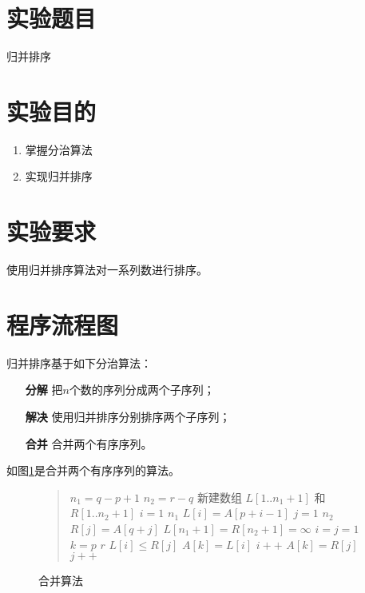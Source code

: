 \documentclass[cs4size,a4paper,nofonts]{ctexart}
\begin{document}
\newpage

\section{实验题目}
归并排序
\section{实验目的}
\begin{enumerate}[topsep=0pt,partopsep=0pt,itemsep=0pt,parsep=0pt]
\item 掌握分治算法
\item 实现归并排序
\end{enumerate}
\section{实验要求}
使用归并排序算法对一系列数进行排序。

\begin{quote}

\end{quote}

\section{程序流程图}

归并排序基于如下分治算法：
\begin{enumerate}[topsep=0pt,partopsep=0pt,itemsep=0pt,parsep=0pt]
\item[\bf 分解] 把$n$个数的序列分成两个子序列；
\item[\bf 解决] 使用归并排序分别排序两个子序列；
\item[\bf 合并] 合并两个有序序列。
\end{enumerate}

如图\ref{Merge}是合并两个有序序列的算法。

\begin{figure}[htp]
\begin{quote}
\begin{codebox}
\li $n_1 = q - p + 1$
\li $n_2 = r - q$
\li 新建数组 $L[1..n_1+1]$ 和 $R[1..n_2+1]$
\li \For $i = 1$ \To $n_1$ \Do
\li   $L[i] = A[p + i -1]$
     \End
\li \For $j = 1$ \To $n_2$ \Do
\li   $R[j] = A[q + j]$
     \End
\li $L[n_1 + 1] = R[n_2 + 1] = \infty$
\li $i = j = 1$
\li \For $k = p$ \To $r$ \Do
\li   \If $L[i] \le R[j]$ \Then
\li     $A[k] = L[i]$
\li     $i++$
\li   \Else
\li     $A[k] = R[j]$
\li     $j++$
       \End
     \End
\end{codebox}
\end{quote}
\caption{\label{Merge}合并算法}
\end{figure}
\end{document}
